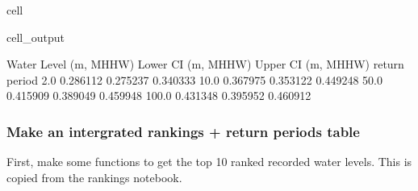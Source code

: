 \documentclass[letterpaper,10pt,english]{jupyterBook}
\begin{document}
\begin{sphinxuseclass}{cell}
\begin{sphinxVerbatimOutput}
\begin{sphinxuseclass}{cell_output}
\begin{sphinxVerbatim}[commandchars=\\\{\}]
               Water Level (m, MHHW)  Lower CI (m, MHHW)  Upper CI (m, MHHW)
return period                                                               
2.0                         0.286112            0.275237            0.340333
10.0                        0.367975            0.353122            0.449248
50.0                        0.415909            0.389049            0.459948
100.0                       0.431348            0.395952            0.460912
\end{sphinxVerbatim}

\end{sphinxuseclass}\end{sphinxVerbatimOutput}

\end{sphinxuseclass}

\subsubsection{Make an intergrated rankings + return periods table}
\label{\detokenize{notebooks/regional_and_local/SL_Extremes_annual:make-an-intergrated-rankings-return-periods-table}}
\sphinxAtStartPar
First, make some functions to get the top 10 ranked recorded water levels. This is copied from the rankings notebook.
\end{document}
